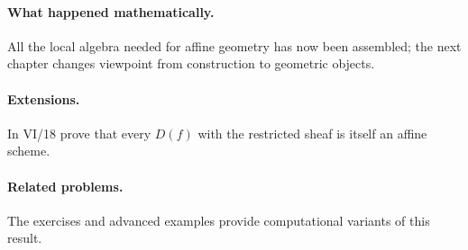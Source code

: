 \paragraph{What happened mathematically.}
All the local algebra needed for affine geometry has now been assembled; the next chapter changes viewpoint from construction to geometric objects.

\paragraph{Extensions.}
In VI/18 prove that every $D(f)$ with the restricted sheaf is itself an affine scheme.

\paragraph{Related problems.}
The exercises and advanced examples provide computational variants of this result.
\fi
